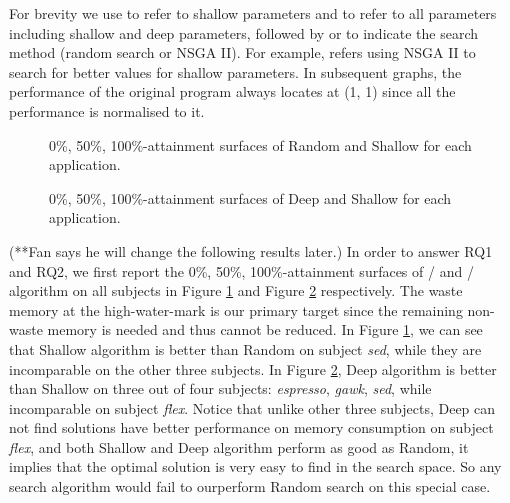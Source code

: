 For brevity we use \emph{\shallow} to refer to shallow parameters and \emph{\all} to refer to all parameters including shallow and deep parameters, followed by \emph{\randomsearch} or \emph{\nsgaii} to indicate the search method (random search or NSGA II). For example, \sn{} refers using NSGA II to search for better values for shallow parameters.
In subsequent graphs, the performance of the original program always locates at (1, 1) since all the performance is normalised to it.

\begin{figure}[htbp]
	\centering
	\subfigure[espresso]{
		\label{fig_shallow_random_espresso}
		\texttt{[image: tba]}%
	}
	\subfigure[gawk]{
		\label{fig_shallow_random_gawk}
		\texttt{[image: tba]}%
	}
	\subfigure[flex]{
		\label{fig_shallow_random_flex}
		\texttt{[image: tba]}%
	}
	\subfigure[sed]{
		\label{fig_shallow_random_sed}
		\texttt{[image: tba]}%
	}
	\caption{0\%, 50\%, 100\%-attainment surfaces of Random and Shallow for each application.}\label{fig_shallow_random}
\end{figure}

\begin{figure}[htbp]
	\centering
	\subfigure[espresso]{
		\label{fig_deep_shallow_espresso}
		\texttt{[image: tba]}%
	}
	\subfigure[gawk]{
		\label{fig_deep_shallow_gawk}
		\texttt{[image: tba]}%
	}
	\subfigure[flex]{
		\label{fig_deep_shallow_flex}
		\texttt{[image: tba]}%
	}
	\subfigure[sed]{
		\label{fig_deep_shallow_sed}
		\texttt{[image: tba]}%
	}
	\caption{0\%, 50\%, 100\%-attainment surfaces of Deep and Shallow for each application.}\label{fig_deep_shallow}
\end{figure}

(**Fan says he will change the following results later.)
In order to answer RQ1 and RQ2, we first report the 0\%, 50\%, 100\%-attainment surfaces of \sr{}/\sn{} and \sn{}/\dn{} algorithm on all subjects in Figure \ref{fig_shallow_random} and Figure \ref{fig_deep_shallow} respectively. The waste memory at the high-water-mark is our primary target since the remaining non-waste memory is needed and thus cannot be reduced. In Figure \ref{fig_shallow_random}, we can see that Shallow algorithm is better than Random on subject \emph{sed}, while they are incomparable on the other three subjects. In Figure \ref{fig_deep_shallow}, Deep algorithm is better than Shallow on three out of four subjects: \emph{espresso}, \emph{gawk}, \emph{sed}, while incomparable on subject \emph{flex}. Notice that unlike other three subjects, Deep can not find solutions have better performance on memory consumption on subject \emph{flex}, and both Shallow and Deep algorithm perform as good as Random, it implies that the optimal solution is very easy to find in the search space. So any search algorithm would fail to ourperform Random search on this special case.

